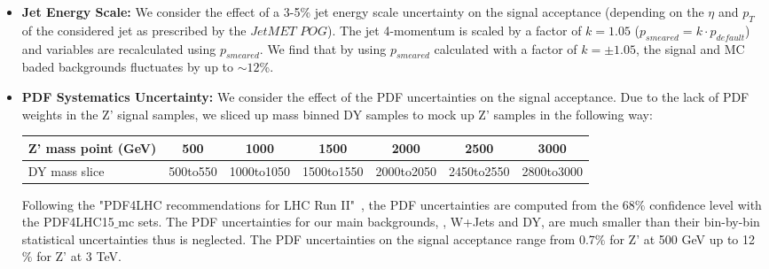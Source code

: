 \begin{itemize}
  \item \textbf{Jet Energy Scale:} We consider the effect of a 3-5\% jet energy scale uncertainty on the signal 
acceptance (depending on the $\eta$ and $p_{T}$ of the considered jet as prescribed by the $JetMET$ $POG$). The jet 
4-momentum is scaled by a factor of $k=1.05$ ($p_{smeared} = k \cdot p_{default}$) and variables are recalculated 
using $p_{smeared}$. We find that by using $p_{smeared}$ calculated with
a factor of $k=\pm 1.05$, the signal and MC baded backgrounds fluctuates by up to $\sim 12$\%. 
%

  \item \textbf{PDF Systematics Uncertainty:} We consider the effect of the PDF uncertainties on the signal acceptance. 
Due to the lack of PDF weights in the Z' signal samples, we sliced up mass binned DY samples to mock up Z' samples in 
the following way:
\begin{table}[ht]	
  \begin{tabular}{| l | c | c | c | c | c | c |} 
  \hline\hline 
  Z' mass point (GeV) & 500 & 1000 & 1500 & 2000 & 2500 & 3000\\
  \hline
  DY mass slice & 500to550 & 1000to1050 & 1500to1550 & 2000to2050 & 2450to2550 & 2800to3000\\
  \hline \hline
  \end{tabular}
\end{table}

Following the "PDF4LHC recommendations for LHC Run
II"~\cite{PDF4LHC15}, the PDF uncertainties are computed from the
68$\%$ confidence level with the PDF4LHC15$\_$mc sets. The PDF
uncertainties for our main backgrounds, \ttbar, W+Jets and DY, are
much smaller than their bin-by-bin statistical uncertainties thus is
neglected. The PDF uncertainties on the signal acceptance range from
0.7$\%$ for Z' at 500 GeV up to 12$\%$ for Z' at 3 TeV.



\end{itemize}
